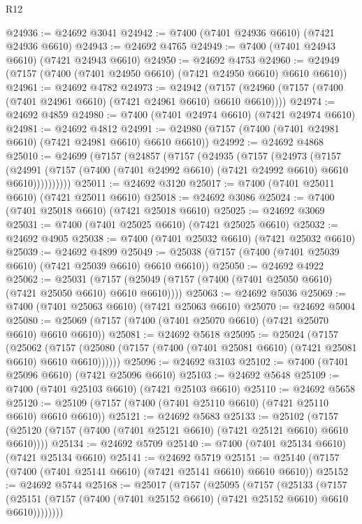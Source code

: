 \begin{lexlean}{R12}
\begin{coremodule}
@24936 := @24692 @3041
@24942 := @7400 (@7401 @24936 @6610) (@7421 @24936 @6610)
@24943 := @24692 @4765
@24949 := @7400 (@7401 @24943 @6610) (@7421 @24943 @6610)
@24950 := @24692 @4753
@24960 := @24949 (@7157 (@7400 (@7401 @24950 @6610) (@7421 @24950 @6610) @6610 @6610))
@24961 := @24692 @4782
@24973 := @24942
    (@7157 (@24960 (@7157 (@7400 (@7401 @24961 @6610) (@7421 @24961 @6610) @6610 @6610))))
@24974 := @24692 @4859
@24980 := @7400 (@7401 @24974 @6610) (@7421 @24974 @6610)
@24981 := @24692 @4812
@24991 := @24980 (@7157 (@7400 (@7401 @24981 @6610) (@7421 @24981 @6610) @6610 @6610))
@24992 := @24692 @4868
@25010 := @24699
    (@7157
      (@24857
        (@7157
          (@24935
            (@7157
              (@24973
                (@7157
                  (@24991
                    (@7157 (@7400 (@7401 @24992 @6610) (@7421 @24992 @6610) @6610 @6610))))))))))
@25011 := @24692 @3120
@25017 := @7400 (@7401 @25011 @6610) (@7421 @25011 @6610)
@25018 := @24692 @3086
@25024 := @7400 (@7401 @25018 @6610) (@7421 @25018 @6610)
@25025 := @24692 @3069
@25031 := @7400 (@7401 @25025 @6610) (@7421 @25025 @6610)
@25032 := @24692 @4905
@25038 := @7400 (@7401 @25032 @6610) (@7421 @25032 @6610)
@25039 := @24692 @4899
@25049 := @25038 (@7157 (@7400 (@7401 @25039 @6610) (@7421 @25039 @6610) @6610 @6610))
@25050 := @24692 @4922
@25062 := @25031
    (@7157 (@25049 (@7157 (@7400 (@7401 @25050 @6610) (@7421 @25050 @6610) @6610 @6610))))
@25063 := @24692 @5036
@25069 := @7400 (@7401 @25063 @6610) (@7421 @25063 @6610)
@25070 := @24692 @5004
@25080 := @25069 (@7157 (@7400 (@7401 @25070 @6610) (@7421 @25070 @6610) @6610 @6610))
@25081 := @24692 @5618
@25095 := @25024
    (@7157
      (@25062
        (@7157 (@25080 (@7157 (@7400 (@7401 @25081 @6610) (@7421 @25081 @6610) @6610 @6610))))))
@25096 := @24692 @3103
@25102 := @7400 (@7401 @25096 @6610) (@7421 @25096 @6610)
@25103 := @24692 @5648
@25109 := @7400 (@7401 @25103 @6610) (@7421 @25103 @6610)
@25110 := @24692 @5658
@25120 := @25109 (@7157 (@7400 (@7401 @25110 @6610) (@7421 @25110 @6610) @6610 @6610))
@25121 := @24692 @5683
@25133 := @25102
    (@7157 (@25120 (@7157 (@7400 (@7401 @25121 @6610) (@7421 @25121 @6610) @6610 @6610))))
@25134 := @24692 @5709
@25140 := @7400 (@7401 @25134 @6610) (@7421 @25134 @6610)
@25141 := @24692 @5719
@25151 := @25140 (@7157 (@7400 (@7401 @25141 @6610) (@7421 @25141 @6610) @6610 @6610))
@25152 := @24692 @5744
@25168 := @25017
    (@7157
      (@25095
        (@7157
          (@25133
            (@7157
              (@25151 (@7157 (@7400 (@7401 @25152 @6610) (@7421 @25152 @6610) @6610 @6610))))))))

\end{coremodule}
\end{lexlean}

